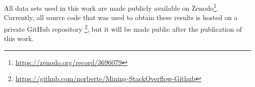         All data sets used in this work are made publicly available on Zenodo\footnote{\url{https://zenodo.org/record/3696079}}. Currently, all source code that was used to obtain these results is hosted on a private GitHub repository \footnote{\url{https://github.com/norberte/Mining-StackOverflow-Github}}, but it will be made public after the publication of this work.